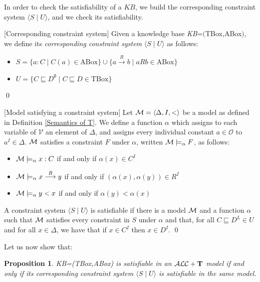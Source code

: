 \documentclass[a4paper, 11pt, oneside]{duthesis}
\newcommand{\tip}{{\bf T}}
\newcommand{\alct}{\mathcal{ALC}+\tip}
\newcommand{\unione} {\cup}
\newcommand{\vuoto} {\emptyset}
\newcommand{\tc} {\mid}
\newcommand{\sx} {\langle}
\newcommand{\dx} {\rangle}
\newcommand{\emme} {\begin{mathcal}M\end{mathcal}}
\newcommand{\trans}[1]{\stackrel{#1}{\longrightarrow}}
\newenvironment{definition}
{\begin{defi} \rm}{\qed \end{defi}}
\newenvironment{definition}
{\begin{defi} \rm}{\qed \end{defi}}
\newtheorem{definition}{Definition}
\newtheorem{proposition}{Proposition}
\newcounter{posu}
\newtheorem{proposition}[posu]{Proposition}
\newtheorem{definition}[posu]{Definition}
\begin{document}
\noindent In order to check the satisfiability of a $KB$, we build the corresponding constraint system $\sx S \tc U \dx$, and we check its satisfiability.

\begin{definition}[Corresponding constraint system]\label{corresponding constraint system}
Given a knowledge base \emph{KB}=$($TBox,ABox$)$, we define its \emph{corresponding constraint system} $\sx S \tc U \dx$ as follows:

\begin{itemize}
 \item $S=\{a: C \tc C(a) \in \mbox{ABox}\} \unione \{a \trans{R} b \tc a R b \in \mbox{ABox}\}$
 \item $U=\{C \sqsubseteq D^{\vuoto} \tc C \sqsubseteq D \in \mbox{TBox}\}$
\end{itemize}

\end{definition}

\begin{definition}[Model satisfying a constraint system]\label{modello constraint}
Let $\emme=\sx \Delta, I, < \dx$ be a model as defined in Definition \ref{Semantics of T}. We define a function $\alpha$ which assigns to each variable of $\mathcal{V}$ an element of $\Delta$, and assigns every individual constant $a \in \mathcal{O}$ to $a^{I} \in \Delta$.
$\emme$ satisfies  a constraint $F$ under $\alpha$, written $\emme \models_\alpha F$, as follows:

\begin{itemize}
 \item $\emme \models_\alpha x: C$  if and only if $\alpha(x) \in C^{I}$
 \item $\emme \models_\alpha x \trans{R} y$ if and only if $(\alpha(x),\alpha(y)) \in R^{I}$
 \item $\emme \models_\alpha y < x$ if and only if $\alpha(y) < \alpha(x)$
\end{itemize}

A constraint system $\sx S \tc U \dx$ is satisfiable if there is a model $\emme$ and a function $\alpha$ such that $\emme$ satisfies  every constraint in $S$ under $\alpha$ and that, for all $C \sqsubseteq D^L \in U$ and for all $x \in \Delta$, we have that if $x \in C^I$ then $x \in D^I$.
\end{definition}

Let us now show that:

\begin{proposition}\label{corresp constr system} KB=(TBox,ABox) is satisfiable in an $\alct$ model if
and only if its corresponding constraint system $\sx S \tc U \dx$ is satisfiable in the same model.
\end{proposition}
\end{document}
